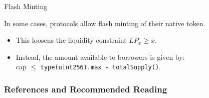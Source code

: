 \documentclass[handout]{beamer}
\begin{document}
\begin{frame}{Flash Minting}

	In some cases, protocols allow flash minting of their native token. \vspace{0.5em}
	
	\begin{itemize}
		\item This loosens the liquidity constraint $LP_x \geq x$. 
		\item Instead, the amount available to borrowers is given by:\\
			cap $\leq$ \texttt{type(uint256).max - totalSupply()}.
	\end{itemize}
	
	\vspace{1em}
	
	
\end{frame}

\begin{frame}%

\frametitle{References and Recommended Reading}

	
	
\end{frame}
\end{document}

